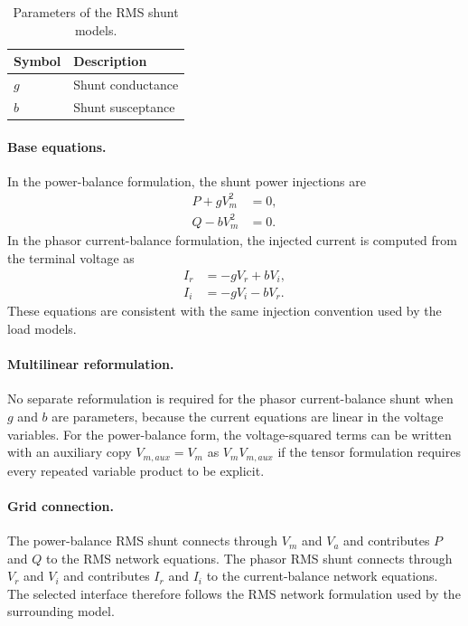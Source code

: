 \begin{table}[H]
    \centering
    \caption{Parameters of the RMS shunt models.}
    \begin{tabular}{ll}
        \toprule
        Symbol & Description \\
        \midrule
        $g$ & Shunt conductance \\
        $b$ & Shunt susceptance \\
        \bottomrule
    \end{tabular}
\end{table}

\paragraph{Base equations.}
In the power-balance formulation, the shunt power injections are
\begin{align}
    P + g V_m^2 &= 0, \\
    Q - b V_m^2 &= 0.
\end{align}
In the phasor current-balance formulation, the injected current is computed from the terminal voltage as
\begin{align}
    I_r &= -g V_r + b V_i, \\
    I_i &= -g V_i - b V_r.
\end{align}
These equations are consistent with the same injection convention used by the load models.

\paragraph{Multilinear reformulation.}
No separate reformulation is required for the phasor current-balance shunt when $g$ and $b$ are parameters, because the current equations are linear in the voltage variables. For the power-balance form, the voltage-squared terms can be written with an auxiliary copy $V_{m,aux}=V_m$ as $V_mV_{m,aux}$ if the tensor formulation requires every repeated variable product to be explicit.

\paragraph{Grid connection.}
The power-balance RMS shunt connects through $V_m$ and $V_a$ and contributes $P$ and $Q$ to the RMS network equations. The phasor RMS shunt connects through $V_r$ and $V_i$ and contributes $I_r$ and $I_i$ to the current-balance network equations. The selected interface therefore follows the RMS network formulation used by the surrounding model.

